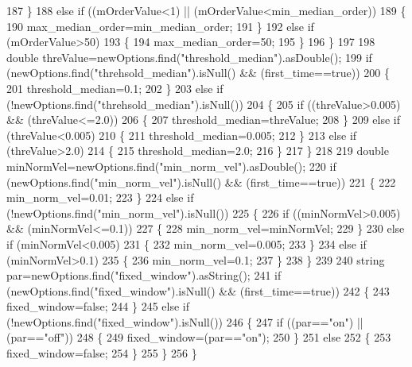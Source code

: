 \begin{DoxyCode}
187         \}
188         \textcolor{keywordflow}{else} \textcolor{keywordflow}{if} ((mOrderValue<1) || (mOrderValue<min_median_order))
189         \{
190             max_median_order=min_median_order;
191         \}
192         \textcolor{keywordflow}{else} \textcolor{keywordflow}{if} (mOrderValue>50)
193         \{
194             max_median_order=50;
195         \}
196     \}
197 
198     \textcolor{keywordtype}{double} threValue=newOptions.find(\textcolor{stringliteral}{"threshold\_median"}).asDouble();
199     \textcolor{keywordflow}{if} (newOptions.find(\textcolor{stringliteral}{"threhsold\_median"}).isNull() && (first\_time==\textcolor{keyword}{true}))
200     \{
201         threshold_median=0.1;
202     \}
203     \textcolor{keywordflow}{else} \textcolor{keywordflow}{if} (!newOptions.find(\textcolor{stringliteral}{"threhsold\_median"}).isNull())
204     \{
205         \textcolor{keywordflow}{if} ((threValue>0.005) && (threValue<=2.0))
206         \{
207             threshold_median=threValue;
208         \}
209         \textcolor{keywordflow}{else} \textcolor{keywordflow}{if} (threValue<0.005)
210         \{
211             threshold_median=0.005;
212         \}
213         \textcolor{keywordflow}{else} \textcolor{keywordflow}{if} (threValue>2.0)
214         \{
215             threshold_median=2.0;
216         \}
217     \}
218 
219     \textcolor{keywordtype}{double} minNormVel=newOptions.find(\textcolor{stringliteral}{"min\_norm\_vel"}).asDouble();
220     \textcolor{keywordflow}{if} (newOptions.find(\textcolor{stringliteral}{"min\_norm\_vel"}).isNull() && (first\_time==\textcolor{keyword}{true}))
221     \{
222         min_norm_vel=0.01;
223     \}
224     \textcolor{keywordflow}{else} \textcolor{keywordflow}{if} (!newOptions.find(\textcolor{stringliteral}{"min\_norm\_vel"}).isNull())
225     \{
226         \textcolor{keywordflow}{if} ((minNormVel>0.005) && (minNormVel<=0.1))
227         \{
228             min_norm_vel=minNormVel;
229         \}
230         \textcolor{keywordflow}{else} \textcolor{keywordflow}{if} (minNormVel<0.005)
231         \{
232             min_norm_vel=0.005;
233         \}
234         \textcolor{keywordflow}{else} \textcolor{keywordflow}{if} (minNormVel>0.1)
235         \{
236             min_norm_vel=0.1;
237         \}
238     \}
239 
240     \textcolor{keywordtype}{string} par=newOptions.find(\textcolor{stringliteral}{"fixed\_window"}).asString();
241     \textcolor{keywordflow}{if} (newOptions.find(\textcolor{stringliteral}{"fixed\_window"}).isNull() && (first\_time==\textcolor{keyword}{true}))
242     \{
243         fixed_window=\textcolor{keyword}{false};
244     \}
245     \textcolor{keywordflow}{else} \textcolor{keywordflow}{if} (!newOptions.find(\textcolor{stringliteral}{"fixed\_window"}).isNull())
246     \{
247         \textcolor{keywordflow}{if} ((par==\textcolor{stringliteral}{"on"}) || (par==\textcolor{stringliteral}{"off"}))
248         \{
249             fixed_window=(par==\textcolor{stringliteral}{"on"});
250         \}
251         \textcolor{keywordflow}{else}
252         \{
253             fixed_window=\textcolor{keyword}{false};
254         \}
255     \}
256 \}
\end{DoxyCode}


